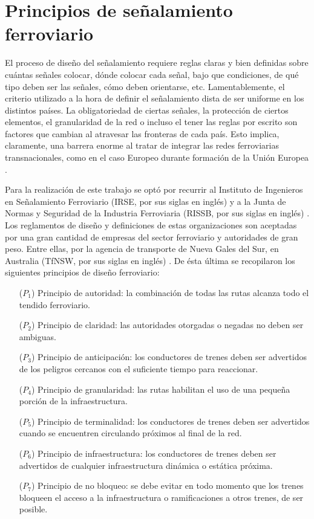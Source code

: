 \section{Principios de señalamiento ferroviario}
    \label{sec:principios}
    
    El proceso de diseño del señalamiento requiere reglas claras y bien definidas sobre cuántas señales colocar, dónde colocar cada señal, bajo que condiciones, de qué tipo deben ser las señales, cómo deben orientarse, etc. Lamentablemente, el criterio utilizado a la hora de definir el señalamiento dista de ser uniforme en los distintos países. La obligatoriedad de ciertas señales, la protección de ciertos elementos, el granularidad de la red o incluso el tener las reglas por escrito son factores que cambian al atravesar las fronteras de cada país. Esto implica, claramente, una barrera enorme al tratar de integrar las redes ferroviarias transnacionales, como en el caso Europeo durante formación de la Unión Europea \cite{Paper_4,Paper_185}.
    
    Para la realización de este trabajo se optó por recurrir al Instituto de Ingenieros en Señalamiento Ferroviario (IRSE, por sus siglas en inglés) \cite{IRSE} y a la Junta de Normas y Seguridad de la Industria Ferroviaria (RISSB, por sus siglas en inglés) \cite{Paper_175,Paper_176,Paper_203}. Los reglamentos de diseño y definiciones de estas organizaciones son aceptadas por una gran cantidad de empresas del sector ferroviario y autoridades de gran peso. Entre ellas, por la agencia de transporte de Nueva Gales del Sur, en Australia (TfNSW, por sus siglas en inglés) \cite{Paper_202}. De ésta última se recopilaron los siguientes principios de diseño ferroviario:
    
    \begin{itemize}
        \item [($P_1$)] Principio de autoridad: la combinación de todas las rutas alcanza todo el tendido ferroviario.
        \item [($P_2$)] Principio de claridad: las autoridades otorgadas o negadas no deben ser ambiguas. 
        \item [($P_3$)] Principio de anticipación: los conductores de trenes deben ser advertidos de los peligros cercanos con el suficiente tiempo para reaccionar.
        \item [($P_4$)] Principio de granularidad: las rutas habilitan el uso de una pequeña porción de la infraestructura.
        \item [($P_5$)] Principio de terminalidad: los conductores de trenes deben ser advertidos cuando se encuentren circulando próximos al final de la red.
        \item [($P_6$)] Principio de infraestructura: los conductores de trenes deben ser advertidos de cualquier infraestructura dinámica o estática próxima.
        \item [($P_7$)] Principio de no bloqueo: se debe evitar en todo momento que los trenes bloqueen el acceso a la infraestructura o ramificaciones a otros trenes, de ser posible.
    \end{itemize}

